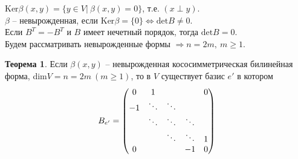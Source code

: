 \documentclass[a4paper, 12pt]{article}
\theoremstyle{definition}
\newtheorem*{theorem}{Теорема}
\begin{document}
        $\text{Ker}\beta(x,y) = \{y \in V|\ \beta(x,y) = 0\}$, т.е. $(x \perp y)$.\\
        $\beta$ -- невырожденная, если $\text{Ker} \beta = \{0\} \Longleftrightarrow \text{det}B \neq 0$.\\
        Если $B^T = - B^T$ и $B$ имеет нечетный порядок, тогда $\text{det}B = 0$.\\
        Будем рассматривать невырожденные формы $\Longrightarrow n = 2m,\ m \geq 1$. 
        \begin{theorem}
            Если $\beta(x,y)$ -- невырожденная кососимметрическая билинейная форма, dim$V = n = 2m\ (m \geq 1)$, то в $V$ существует базис $e'$ в котором
            $$B_{e'} = \begin{pmatrix}
                0 & 1 & \null & \null & 0\\
                -1 & \ddots & \ddots & \null & \null\\
                \null & \ddots & \ddots & \ddots & \null\\
                \null & \null & \ddots & \ddots & 1\\
                0 & \null & \null & -1 & 0
            \end{pmatrix}$$
        \end{theorem}
\end{document}
